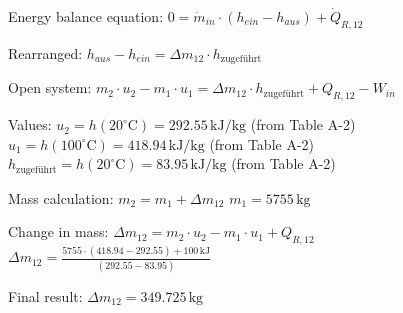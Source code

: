 Energy balance equation:  
\( 0 = \dot{m}_{in} \cdot (h_{ein} - h_{aus}) + \dot{Q}_{R,12} \)  

Rearranged:  
\( h_{aus} - h_{ein} = \Delta m_{12} \cdot h_{\text{zugeführt}} \)  

Open system:  
\( m_2 \cdot u_2 - m_1 \cdot u_1 = \Delta m_{12} \cdot h_{\text{zugeführt}} + Q_{R,12} - W_{in} \)  

Values:  
\( u_2 = h(20^\circ \text{C}) = 292.55 \, \text{kJ/kg} \) (from Table A-2)  
\( u_1 = h(100^\circ \text{C}) = 418.94 \, \text{kJ/kg} \) (from Table A-2)  
\( h_{\text{zugeführt}} = h(20^\circ \text{C}) = 83.95 \, \text{kJ/kg} \) (from Table A-2)  

Mass calculation:  
\( m_2 = m_1 + \Delta m_{12} \)  
\( m_1 = 5755 \, \text{kg} \)  

Change in mass:  
\( \Delta m_{12} = m_2 \cdot u_2 - m_1 \cdot u_1 + Q_{R,12} \)  
\( \Delta m_{12} = \frac{5755 \cdot (418.94 - 292.55) + 100 \, \text{kJ}}{(292.55 - 83.95)} \)  

Final result:  
\( \Delta m_{12} = 349.725 \, \text{kg} \)